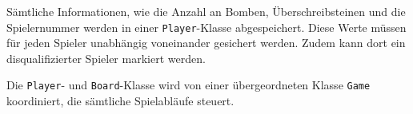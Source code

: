 S\"amtliche Informationen, wie die Anzahl an Bomben, \"Uberschreibsteinen und die Spielernummer werden in einer \texttt{Player}-Klasse abgespeichert.
Diese Werte m\"ussen f\"ur jeden Spieler unabh\"angig voneinander gesichert werden.
Zudem kann dort ein disqualifizierter Spieler markiert werden.

Die \texttt{Player}- und \texttt{Board}-Klasse wird von einer \"ubergeordneten Klasse \texttt{Game} koordiniert, die s\"amtliche Spielabl\"aufe steuert.


\bigskip
\newpage